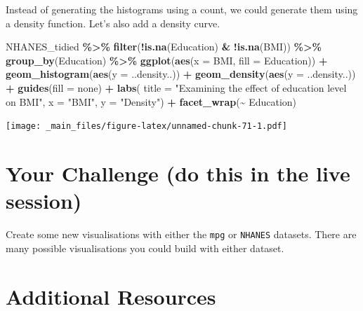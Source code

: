 \documentclass[
]{book}
\newenvironment{Shaded}{\begin{snugshade}}{\end{snugshade}}
\newcommand{\AttributeTok}[1]{\textcolor[rgb]{0.13,0.29,0.53}{#1}}
\newcommand{\FunctionTok}[1]{\textcolor[rgb]{0.13,0.29,0.53}{\textbf{#1}}}
\newcommand{\NormalTok}[1]{#1}
\newcommand{\SpecialCharTok}[1]{\textcolor[rgb]{0.81,0.36,0.00}{\textbf{#1}}}
\newcommand{\StringTok}[1]{\textcolor[rgb]{0.31,0.60,0.02}{#1}}
\begin{document}
Instead of generating the histograms using a count, we could generate them using a density function. Let's also add a density curve.

\begin{Shaded}
\begin{Highlighting}[]
\NormalTok{NHANES\_tidied }\SpecialCharTok{\%\textgreater{}\%} 
  \FunctionTok{filter}\NormalTok{(}\SpecialCharTok{!}\FunctionTok{is.na}\NormalTok{(Education) }\SpecialCharTok{\&} \SpecialCharTok{!}\FunctionTok{is.na}\NormalTok{(BMI)) }\SpecialCharTok{\%\textgreater{}\%}
  \FunctionTok{group\_by}\NormalTok{(Education) }\SpecialCharTok{\%\textgreater{}\%} 
  \FunctionTok{ggplot}\NormalTok{(}\FunctionTok{aes}\NormalTok{(}\AttributeTok{x =}\NormalTok{ BMI, }\AttributeTok{fill =}\NormalTok{ Education)) }\SpecialCharTok{+}
  \FunctionTok{geom\_histogram}\NormalTok{(}\FunctionTok{aes}\NormalTok{(}\AttributeTok{y =}\NormalTok{ ..density..)) }\SpecialCharTok{+}
  \FunctionTok{geom\_density}\NormalTok{(}\FunctionTok{aes}\NormalTok{(}\AttributeTok{y =}\NormalTok{ ..density..)) }\SpecialCharTok{+}
  \FunctionTok{guides}\NormalTok{(}\AttributeTok{fill =} \StringTok{\textquotesingle{}none\textquotesingle{}}\NormalTok{) }\SpecialCharTok{+} 
  \FunctionTok{labs}\NormalTok{( }\AttributeTok{title =} \StringTok{"Examining the effect of education level on BMI"}\NormalTok{, }
        \AttributeTok{x =} \StringTok{"BMI"}\NormalTok{, }
        \AttributeTok{y =} \StringTok{"Density"}\NormalTok{) }\SpecialCharTok{+} 
  \FunctionTok{facet\_wrap}\NormalTok{(}\SpecialCharTok{\textasciitilde{}}\NormalTok{ Education)}
\end{Highlighting}
\end{Shaded}

\texttt{[image: \_main\_files/figure-latex/unnamed-chunk-71-1.pdf]}

\hypertarget{your-challenge-do-this-in-the-live-session}{%
\section{Your Challenge (do this in the live session)}\label{your-challenge-do-this-in-the-live-session}}

Create some new visualisations with either the \texttt{mpg} or \texttt{NHANES} datasets. There are many possible visualisations you could build with either dataset.

\hypertarget{additional-resources}{%
\section{Additional Resources}\label{additional-resources}}
\end{document}
